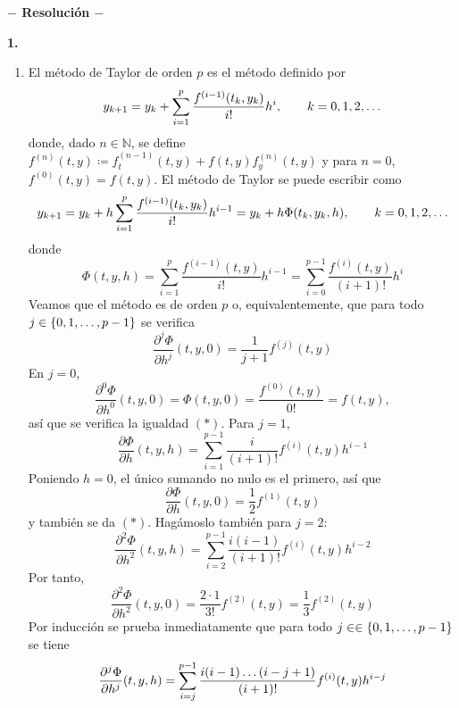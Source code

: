 \documentclass[11pt]{report}
\newcommand{\N}{\mathbb N}
\begin{document}




\begin{center}

	\textbf{$-$ Resolución $-$}

\end{center}


\textbf{1.}

\begin{enumerate}
    \item El método de Taylor de orden $p$ es el método definido por 
    \[y_{k+1} = y_k+\sum_{i=1}^p \frac{f^{(i-1)}(t_k,y_k)}{i!}h^i, \qquad k =0,1,2,\mathellipsis\]
    donde, dado $n \in \N$, se define $f^{(n)}(t,y) \coloneqq f^{(n-1)}_t(t,y)+f(t,y)f^{(n)}_y(t,y)$ y para $n = 0$, $f^{(0)}(t,y)=f(t,y)$. El método de Taylor se puede escribir como
    \[y_{k+1} = y_k+h\sum_{i=1}^p \frac{f^{(i-1)}(t_k,y_k)}{i!}h^{i-1} =y_k+h\Phi(t_k,y_k,h), \qquad k =0,1,2,\mathellipsis\]
    donde
    \[\Phi(t,y,h) = \sum_{i=1}^p \frac{f^{(i-1)}(t,y)}{i!}h^{i-1} = \sum_{i=0}^{p-1}\frac{f^{(i)}(t,y)}{(i+1)!}h^i\]
    Veamos que el método es de orden $p$ o, equivalentemente, que para todo $j \in \{0,1,\mathellipsis,p-1\}$ se verifica
    \[\frac{\partial^j \Phi}{\partial h^j}(t,y,0) = \frac{1}{j+1}f^{(j)}(t,y) \tag{$\ast$}\]
    En $j = 0$,
    \[\frac{\partial^0 \Phi}{\partial h^0}(t,y,0) = \Phi(t,y,0) = \frac{f^{(0)}(t,y)}{0!} = f(t,y),\]
    así que se verifica la igualdad $(*)$. Para $j=1$,
    \[\frac{\partial \Phi}{\partial h} (t,y,h)=\sum_{i=1}^{p-1}\frac{i}{(i+1)!}f^{(i)}(t,y)h^{i-1}\]
    Poniendo $h=0$, el único sumando no nulo es el primero, así que
    \[\frac{\partial \Phi}{\partial h} (t,y,0)=\frac{1}{2}f^{(1)}(t,y)\]
    y también se da $(\ast)$. Hagámoslo también para $j = 2$:
    \[\frac{\partial^2\Phi}{\partial h^2}(t,y,h) = \sum_{i=2}^{p-1} \frac{i(i-1)}{(i+1)!}f^{(i)}(t,y)h^{i-2}\]
    Por tanto,
    \[\frac{\partial^2 \Phi}{\partial h^2}(t,y,0) = \frac{2 \cdot 1}{3!}f^{(2)}(t,y) = \frac{1}{3}f^{(2)}(t,y)\]
    Por inducción se prueba inmediatamente que para todo $j \in \in \{0,1,\mathellipsis,p-1\}$ se tiene
    \[\frac{\partial^j \Phi}{\partial h^j} (t,y,h) = \sum_{i=j}^{p-1}\frac{i(i-1)\mathellipsis(i-j+1)}{(i+1)!}f^{(i)}(t,y)h^{i-j}\]

\end{enumerate}
\end{document}
